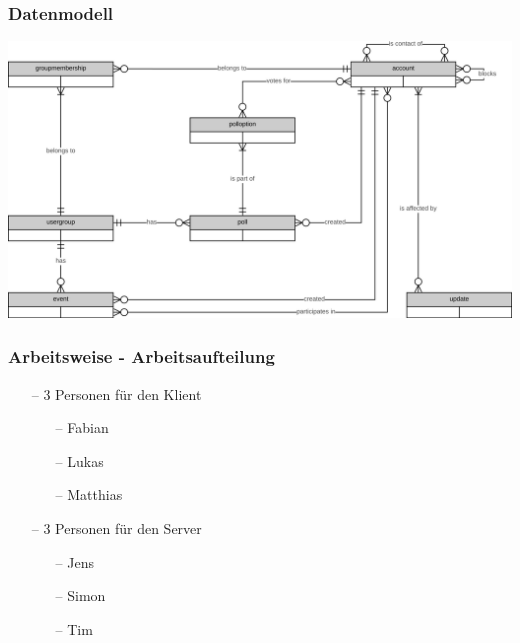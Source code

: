 \documentclass[aspectratio=1610]{beamer}
\begin{document}

  \begin{frame}[plain]
      \frametitle{\textbf{Datenmodell}}
      \includegraphics[width = \columnwidth - 30pt]
        {images/erd.png}
  \end{frame}


  \begin{frame}[plain]
      \frametitle{\textbf{Arbeitsweise} - Arbeitsaufteilung}
      \begin{itemize}
          \setlength\itemsep{0.3em}
          \item[--] 3 Personen für den Klient
              \begin{itemize}
                  \item[--] Fabian
                  \item[--] Lukas
                  \item[--] Matthias
              \end{itemize}
          \item[--] 3 Personen für den Server
              \begin{itemize}
                  \item[--] Jens
                  \item[--] Simon
                  \item[--] Tim
              \end{itemize}
      \end{itemize}
  \end{frame}
\end{document}
